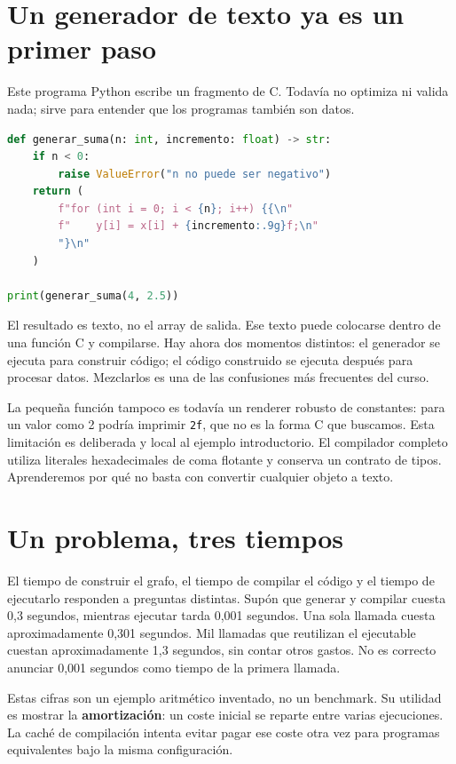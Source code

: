\documentclass[12pt,a4paper,oneside]{report}
\begin{document}
\section{Un generador de texto ya es un primer paso}
Este programa Python escribe un fragmento de C. Todavía no optimiza ni valida nada; sirve para entender que los programas también son datos.

\begin{lstlisting}[language=Python]
def generar_suma(n: int, incremento: float) -> str:
    if n < 0:
        raise ValueError("n no puede ser negativo")
    return (
        f"for (int i = 0; i < {n}; i++) {{\n"
        f"    y[i] = x[i] + {incremento:.9g}f;\n"
        "}\n"
    )

print(generar_suma(4, 2.5))
\end{lstlisting}
El resultado es texto, no el array de salida. Ese texto puede colocarse dentro de una función C y compilarse. Hay ahora dos momentos distintos: el generador se ejecuta para construir código; el código construido se ejecuta después para procesar datos. Mezclarlos es una de las confusiones más frecuentes del curso.

La pequeña función tampoco es todavía un renderer robusto de constantes: para un valor como 2 podría imprimir \texttt{2f}, que no es la forma C que buscamos. Esta limitación es deliberada y local al ejemplo introductorio. El compilador completo utiliza literales hexadecimales de coma flotante y conserva un contrato de tipos. Aprenderemos por qué no basta con convertir cualquier objeto a texto.

\section{Un problema, tres tiempos}
El tiempo de construir el grafo, el tiempo de compilar el código y el tiempo de ejecutarlo responden a preguntas distintas. Supón que generar y compilar cuesta 0,3 segundos, mientras ejecutar tarda 0,001 segundos. Una sola llamada cuesta aproximadamente 0,301 segundos. Mil llamadas que reutilizan el ejecutable cuestan aproximadamente 1,3 segundos, sin contar otros gastos. No es correcto anunciar 0,001 segundos como tiempo de la primera llamada.

Estas cifras son un ejemplo aritmético inventado, no un benchmark. Su utilidad es mostrar la \textbf{amortización}: un coste inicial se reparte entre varias ejecuciones. La caché de compilación intenta evitar pagar ese coste otra vez para programas equivalentes bajo la misma configuración.
\end{document}
